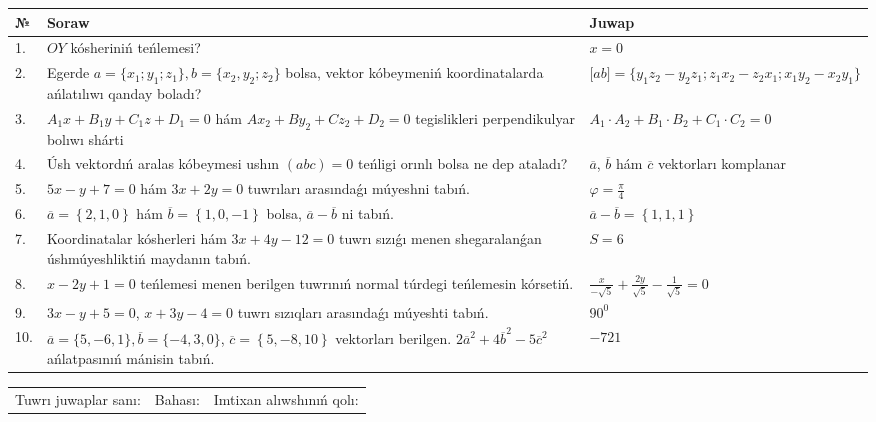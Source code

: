 \documentclass{article}
\begin{document}
\begin{tabular}{|m{0.7cm}|m{10cm}|m{4cm}|}
\hline
№ & Soraw & Juwap \\
\hline
1. & $OY$ kósheriniń teńlemesi? & $x=0$ \\
\hline
2. & Egerde $a=\{ x_1; y_1; z_1\}, b=\{ x_2, y_2; z_2\}$ bolsa, vektor kóbeymeniń koordinatalarda ańlatılıwı qanday boladı? &  $\lbrack ab\rbrack=\{y_1z_2-y_2z_1; z_1x_2-z_2x_1; x_1y_2-x_2y_1\}$ \\
\hline
3. & $A_1x+B_1y+C_1z+D_1=0$ hám $Ax_2+By_2+Cz_2+D_2=0$ tegislikleri perpendikulyar bolıwı shárti & $A_1\cdot A_2+B_1\cdot B_2+C_1\cdot C_2=0$ \\
\hline
4. & Úsh vektordıń aralas kóbeymesi ushın $(abc)=0$ teńligi orınlı bolsa ne dep ataladı? & $\overline{a}$, $\overline{b}$ hám $\overline{c}$ vektorları komplanar \\
\hline
5. & $5x-y+7=0$ hám $3x+2y=0$ tuwrıları arasındaǵı múyeshni tabıń. & $\varphi=\frac{\pi}{4}$ \\
\hline
6. & $\overline{a}=\left\{ 2, 1, 0 \right\}$ hám $\overline{b}=\left\{ 1, 0,-1 \right\}$ bolsa, $\overline{a}-\overline{b}$ ni tabıń. & $\overline{a} -\overline{b} = \left\{ 1,1,1 \right\}$ \\
\hline
7. & Koordinatalar kósherleri hám $ 3x+4y-12=0 $ tuwrı sızıǵı menen shegaralanǵan úshmúyeshliktiń maydanın tabıń. & $ S=6 $ \\
\hline
8. & $x-2y+1=0$ teńlemesi menen berilgen tuwrınıń normal túrdegi teńlemesin kórsetiń. & $\frac{x}{- \sqrt{5}}+\frac{2y}{\sqrt{5}}-\frac{1}{\sqrt{5}}=0$ \\
\hline
9. & $3x-y+5=0$, $x+3y-4=0$ tuwrı sızıqları arasındaǵı múyeshti tabıń. & $90^{0}$ \\
\hline
10. & $\overline{a}=\{5,-6, 1 \}, \overline{b}=\{-4, 3, 0 \} $, $\overline{c}=\left\{ 5,-8, 10 \right\}$ vektorları berilgen. $2{\overline{a}}^{2}+4{\overline{b}}^{2}-5{\overline{c}}^{2}$ ańlatpasınıń mánisin tabıń. & $-721$ \\
\hline
\end{tabular}

\vspace{1cm}

\begin{tabular}{lll}
Tuwrı juwaplar sanı: \underline{\hspace{1.5cm}} & 
Bahası: \underline{\hspace{1.5cm}} & 
Imtixan alıwshınıń qolı: \underline{\hspace{2cm}} \\
\end{tabular}
\end{document}

